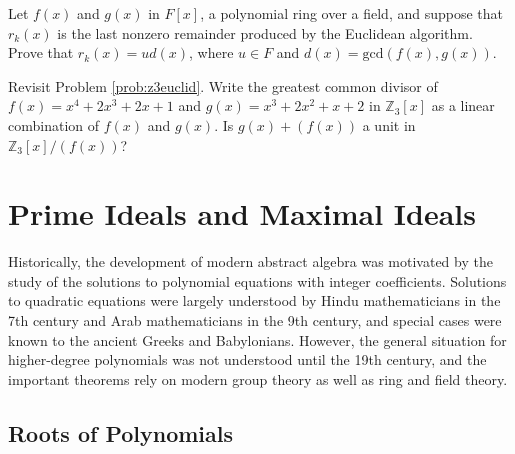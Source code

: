 \begin{problem}\label{prob:eucalgpf4}
Let \(f(x)\) and \(g(x)\) in \(F[x]\), a polynomial ring over a field, and suppose that \(r_k(x)\) is the last nonzero remainder produced by the Euclidean algorithm. Prove that \(r_k(x) = ud(x)\), where \(u \in F\) and \(d(x)=\mbox{gcd}(f(x),g(x))\).
\begin{annotation}
\end{annotation}
\end{problem}


\begin{problem}\label{prob:backsub2}
Revisit Problem \ref{prob:z3euclid}. Write the greatest common divisor of \(f(x)=x^4+2x^3+2x+1\) and \(g(x) = x^3+2x^2+x+2\) in \(\mathbb{Z}_3[x]\) as a linear combination of \(f(x)\) and \(g(x)\). Is \(g(x)+(f(x))\) a unit in \(\mathbb{Z}_3[x]/(f(x))\)?
\end{problem}

\chapter{Prime Ideals and Maximal Ideals}

Historically, the development of modern abstract algebra was motivated by the study of the solutions to polynomial equations with integer coefficients. Solutions to quadratic equations were largely understood by Hindu mathematicians in the 7th century and Arab mathematicians in the 9th century, and special cases were known to the ancient Greeks and Babylonians. However, the general situation for higher-degree polynomials was not understood until the 19th century, and the important theorems rely on modern group theory as well as ring and field theory.
\begin{annotation}
\end{annotation}

\section{Roots of Polynomials}

